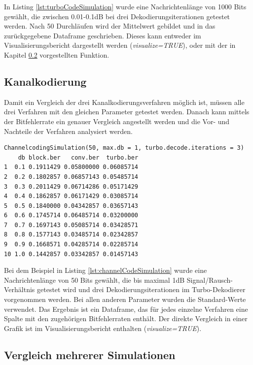 In Listing \ref{lst:turboCodeSimulation} wurde eine Nachrichtenlänge von 1000 Bits gewählt, die zwischen 0.01-0.1dB bei drei Dekodierungsiterationen getestet werden. Nach 50 Durchläufen wird der Mittelwert gebildet und in das zurückgegebene Dataframe geschrieben. Dieses kann entweder im Visualisierungsbericht dargestellt werden (\emph{visualize=TRUE}), oder mit der in Kapitel \ref{sec:example_simulations_plot} vorgestellten Funktion.

\subsection{Kanalkodierung}
\label{sec:example_simulations_channel}

Damit ein Vergleich der drei Kanalkodierungsverfahren möglich ist, müssen alle drei Verfahren mit den gleichen Parameter getestet werden. Danach kann mittels der Bitfehlerrate ein genauer Vergleich angestellt werden und die Vor- und Nachteile der Verfahren analysiert werden.

\begin{lstlisting}[caption=Kanalkodierungs-Simulation, label={lst:channelCodeSimulation}, float=!ht]
ChannelcodingSimulation(50, max.db = 1, turbo.decode.iterations = 3)
    db block.ber   conv.ber  turbo.ber
1  0.1 0.1911429 0.05800000 0.06085714
2  0.2 0.1802857 0.06857143 0.05485714
3  0.3 0.2011429 0.06714286 0.05171429
4  0.4 0.1862857 0.06171429 0.03085714
5  0.5 0.1840000 0.04342857 0.03657143
6  0.6 0.1745714 0.06485714 0.03200000
7  0.7 0.1697143 0.05085714 0.03428571
8  0.8 0.1577143 0.03485714 0.02342857
9  0.9 0.1668571 0.04285714 0.02285714
10 1.0 0.1442857 0.03342857 0.01457143
\end{lstlisting}

Bei dem Beispiel in Listing \ref{lst:channelCodeSimulation} wurde eine Nachrichtenlänge von 50 Bits gewählt, die bis maximal 1dB Signal/Rausch-Verhältnis getestet wird und drei Dekodierungsiterationen im Turbo-Dekodierer vorgenommen werden. Bei allen anderen Parameter wurden die Standard-Werte verwendet. Das Ergebnis ist ein Dataframe, das für jedes einzelne Verfahren eine Spalte mit den zugehörigen Bitfehlerraten enthält. Der direkte Vergleich in einer Grafik ist im Visualisierungsbericht enthalten (\emph{visualize=TRUE}). 

\subsection{Vergleich mehrerer Simulationen}
\label{sec:example_simulations_plot}

